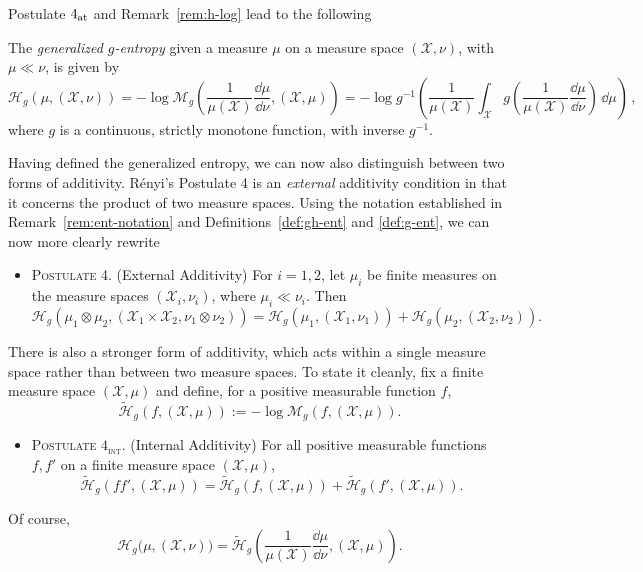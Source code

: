 \documentclass[reqno]{amsart}
\begin{document}
Postulate $4_{\rm at}$ and Remark~\ref{rem:h-log}  lead to the following 
\begin{definition}
\label{def:g-ent}
The {\it generalized $g$-entropy} given a measure $\mu$ on a measure space $(\mathcal{X}, \nu)$, with $\mu \ll \nu$,  is given by 
\begin{equation}
 \label{eq:g-entropy}
\mathcal{H}_g(\mu, (\mathcal{X}, \nu)) = - \log \mathcal{M}_g \left(\dfrac{1}{\mu(\mathcal{X}) } \dfrac{\dd \mu}{\dd \nu}, (\mathcal{X}, \mu) \right) 
=  - \log g^{-1}\left(   \dfrac{1}{\mu(\mathcal{X})} \int_\mathcal{X}  g\left( \dfrac{1}{\mu(\mathcal{X})}\dfrac{\dd \mu}{\dd \nu} \right) \, \dd \mu \right) \, ,
\end{equation}
where $g$  is a continuous, strictly monotone function, with inverse $g^{-1}$.
\end{definition}



Having defined the generalized entropy, we can now also distinguish between two forms of additivity.  R\'enyi's Postulate 4 is an \textit{external} additivity condition in that it concerns the product of two measure spaces. Using the notation established in Remark~\ref{rem:ent-notation} and Definitions~\ref{def:gh-ent} and \ref{def:g-ent}, we can now more clearly rewrite 

\begin{itemize}
    \item[] \textsc{Postulate 4.} (External Additivity) \quad For $i=1,2$, let $\mu_i$ be finite measures on the measure spaces $(\mathcal{X}_i, \nu_i)$, where $\mu_i\ll\nu_i$. Then
    $$
    \mathcal{H}_g\left(
    \mu_1\otimes\mu_2,
    (\mathcal X_1\times\mathcal X_2,\nu_1\otimes\nu_2)
    \right)
    =
    \mathcal{H}_g(\mu_1,(\mathcal X_1,\nu_1))
    +
    \mathcal{H}_g(\mu_2,(\mathcal X_2,\nu_2)).
    $$
\end{itemize}

There is also a stronger form of additivity, which acts within a single measure
space rather than between two measure spaces.  To state it cleanly,
fix a finite measure space $(\mathcal X,\mu)$ and define, for a positive
measurable function $f$,
$$
\widetilde{\mathcal{H}}_g(f,(\mathcal X,\mu))
:=
-\log \mathcal{M}_g(f,(\mathcal X,\mu)).
$$

\begin{itemize}
    \item[] \textsc{Postulate $4_{\mathrm{int}}$.} (Internal Additivity) \quad
    For all positive measurable functions $f,f'$ on a finite measure space
    $(\mathcal X,\mu)$,
    $$
    \widetilde{\mathcal{H}}_g(ff',(\mathcal X,\mu))
    =
    \widetilde{\mathcal{H}}_g(f,(\mathcal X,\mu))
    +
    \widetilde{\mathcal{H}}_g(f',(\mathcal X,\mu)).
    $$
\end{itemize}
Of course, 
$$
\mathcal{H}_g\big(\mu,(\mathcal X,\nu) \big)
=
\widetilde{\mathcal{H}}_g \left(\frac{1}{\mu(\mathcal X)}
\frac{\dd\mu}{\dd\nu},(\mathcal X,\mu) \right).
$$
\end{document}
